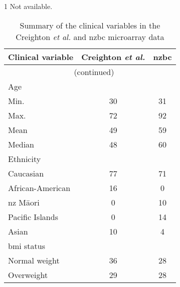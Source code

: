 \begin{ThreePartTable}
		\centering
	\begin{TableNotes}
		\begin{footnotesize}
			\item [1] Not available.
		\end{footnotesize}
	\end{TableNotes}
	
	\begin{longtable}{lcc}
		\caption{Summary of the clinical variables in the Creighton \textit{et al.} and \gls{nzbc} microarray data}
		\label{tab:clin_summary}\\
		Clinical variable & Creighton \textit{et al.} & \gls{nzbc} \\
		\endfirsthead
		\multicolumn{3}{c}{\tablename\ \thetable{}\ (continued)}\\
		\endhead
		\hline
		\hline
		\rule{0pt}{2.25ex}Age \\
		\hspace{1em} Min.                    & 30 & 31 \\
		\hspace{1em} Max.                    & 72 & 92 \\
		\hspace{1em} Mean                    & 49 & 59 \\
		\hspace{1em} Median                  & 48 & 60 \\
		\hline
		\rule{0pt}{2.25ex}Ethnicity         \\
		\hspace{1em} Caucasian               & 77 & 71 \\
		\hspace{1em} African-American        & 16 & 0  \\
		\hspace{1em} \gls{nz} M\=aori        & 0  & 10 \\
		\hspace{1em} Pacific Islands         & 0  & 14 \\
		\hspace{1em} Asian                   & 10 & 4  \\
		\hline
		\rule{0pt}{2.25ex}\gls{bmi} status  \\
		\hspace{1em} Normal weight           & 36 & 28 \\
		\hspace{1em} Overweight              & 29 & 28 \\

\end{longtable}
\end{ThreePartTable}
